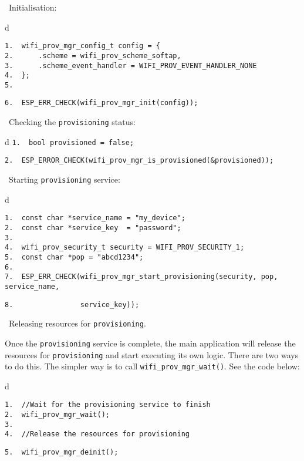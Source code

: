 \documentclass[a4paper,12pt]{book}
\begin{document}
\textbullet\ Initialisation:

\begin{codebloc}
\begin{tabular}{d}
\vspace{2pt}
\begin{verbatim}
1.  wifi_prov_mgr_config_t config = {
2.      .scheme = wifi_prov_scheme_softap,
3.      .scheme_event_handler = WIFI_PROV_EVENT_HANDLER_NONE
4.  };
5.
\end{verbatim}
\verb|6.  ESP_ERR_CHECK(wifi_prov_mgr_init(config));|
\end{tabular}
\end{codebloc}

\textbullet\ Checking the \verb|provisioning| status:

\begin{codebloc}
\begin{tabular}{d}
\verb|1.  bool provisioned = false;|

\verb|2.  ESP_ERROR_CHECK(wifi_prov_mgr_is_provisioned(&provisioned));|
\end{tabular}
\end{codebloc}

\textbullet\ Starting \verb|provisioning| service:

\begin{codebloc}
\begin{tabular}{d}
\vspace{2pt}
\begin{verbatim}
1.  const char *service_name = "my_device";
2.  const char *service_key  = "password";
3.
4.  wifi_prov_security_t security = WIFI_PROV_SECURITY_1;
5.  const char *pop = "abcd1234";
6.
7.  ESP_ERR_CHECK(wifi_prov_mgr_start_provisioning(security, pop, service_name,
\end{verbatim}
\verb|8.                service_key));|
\end{tabular}
\end{codebloc}

\textbullet\ Releasing resources for \verb|provisioning|.

Once the \verb|provisioning| service is complete, the main application will release the resources for \verb|provisioning| and start executing its own logic. There are two ways to do this. The simpler way is to call \verb|wifi_prov_mgr_wait()|. See the code below:

\begin{codebloc}
\begin{tabular}{d}
\vspace{2pt}
\begin{verbatim}
1.  //Wait for the provisioning service to finish
2.  wifi_prov_mgr_wait();
3.
4.  //Release the resources for provisioning
\end{verbatim}
\verb|5.  wifi_prov_mgr_deinit();|
\end{tabular}
\end{codebloc}
\end{document}
